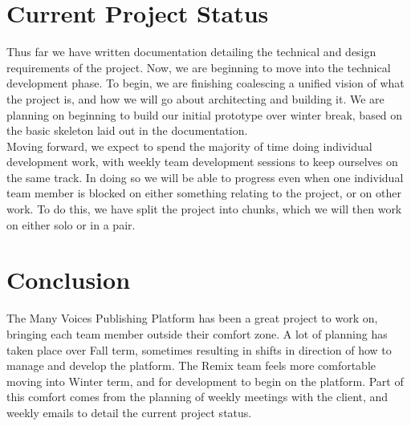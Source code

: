 \documentclass[onecolumn, draftclsnofoot,10pt, compsoc]{IEEEtran}
\begin{document}
\section{Current Project Status}

Thus far we have written documentation detailing the technical and design
requirements of the project.
Now, we are beginning to move into the technical development phase.
To begin, we are finishing coalescing a unified vision of what the project is,
and how we will go about architecting and building it.
We are planning on beginning to build our initial prototype over winter break,
based on the basic skeleton laid out in the documentation. \\

\noindent Moving forward, we expect to spend the majority of time doing
individual development work, with weekly team development sessions to
keep ourselves on the same track.
In doing so we will be able to progress even when one individual team
member is blocked on either something relating to the project, or on other work.
To do this, we have split the project into chunks, which we will then
work on either solo or in a pair.



\section{Conclusion}

The Many Voices Publishing Platform has been a great project to work on,
bringing each team member outside their comfort zone. A lot of planning has
taken place over Fall term, sometimes resulting in shifts in direction of how
to manage and develop the platform. The Remix team feels more comfortable moving
into Winter term, and for development to begin on the platform. Part of this
comfort comes from the planning of weekly meetings with the client, and weekly
emails to detail the current project status.
\end{document}
